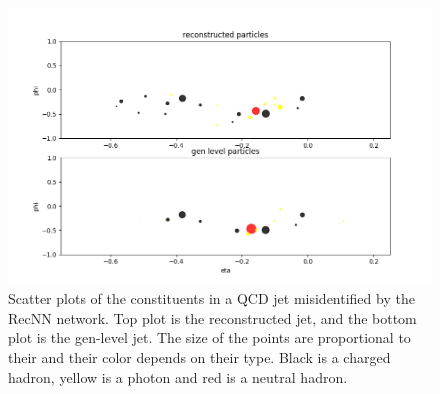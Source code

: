 \begin{figure}
    \centering
    \includegraphics[width=\textwidth]{Images/display.png}
    \caption{Scatter plots of the constituents in a QCD jet misidentified by the RecNN network. Top plot is the reconstructed jet, and the bottom plot is the gen-level jet. The size of the points are proportional to their \pt and their color depends on their type. Black is a charged hadron, yellow is a photon and red is a neutral hadron.}
    \label{fig:jet_display}
\end{figure}
